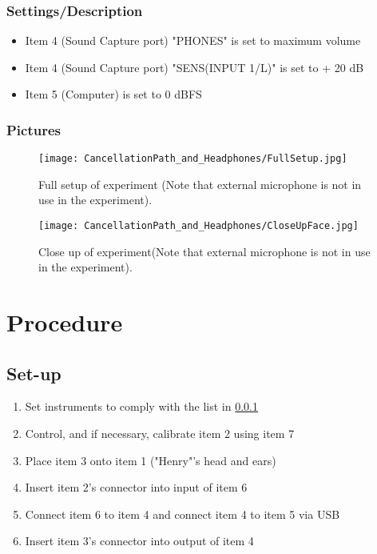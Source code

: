 \subsubsection{Settings/Description}
\label{SettingsCacellationPath}

\begin{itemize}
	\item Item 4 (Sound Capture port) "PHONES" is set to maximum volume
	\item Item 4 (Sound Capture port) "SENS(INPUT 1/L)" is set to + 20 dB		\item Item 5 (Computer) is set to 0 dBFS
\end{itemize}


\subsubsection{Pictures}
\begin{figure}[H]
	\centering
	\texttt{[image: CancellationPath\_and\_Headphones/FullSetup.jpg]}
	\caption{Full setup of experiment (Note that external microphone is not in use in the experiment).}
	\label{FullSetupCancellationPath}
\end{figure}

\begin{figure}[H]
	\centering
	\texttt{[image: CancellationPath\_and\_Headphones/CloseUpFace.jpg]}
	\caption{Close up of experiment(Note that external microphone is not in use in the experiment).}
	\label{CloseUpCancellationPath}
\end{figure}

\section{Procedure}
\subsection{Set-up}
\begin{enumerate}
	\item Set instruments to comply with the list in \ref{SettingsCacellationPath}
	\item Control, and if necessary, calibrate item 2 using item 7
	\item Place item 3 onto item 1 ("Henry"'s head and ears)
	\item Insert item 2's connector into input of item 6
	\item Connect item 6 to item 4 and connect item 4 to item 5 via USB
	\item Insert item 3's connector into output of item 4
\end{enumerate}
